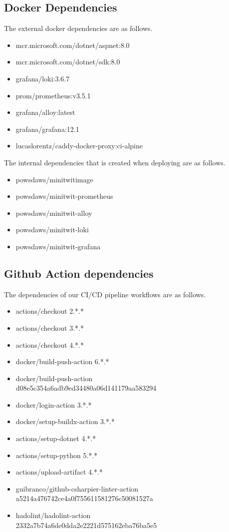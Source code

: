 \subsection*{Docker Dependencies}
The external docker dependencies are as follows.
\begin{itemize}
    \item mcr.microsoft.com/dotnet/aspnet:8.0
    \item mcr.microsoft.com/dotnet/sdk:8.0
    \item grafana/loki:3.6.7
    \item prom/prometheus:v3.5.1
    \item grafana/alloy:latest 
    \item grafana/grafana:12.1
    \item lucaslorentz/caddy-docker-proxy:ci-alpine
\end{itemize}
The internal dependencies that is created when deploying are as follows.
\begin{itemize}
    \item powsdaws/minitwitimage
    \item powsdaws/minitwit-prometheus
    \item powsdaws/minitwit-alloy
    \item powsdaws/minitwit-loki
    \item powsdaws/minitwit-grafana
\end{itemize}

\subsection*{Github Action dependencies}
The dependencies of our CI/CD pipeline workflows are as follows.
\begin{itemize}
    \item actions/checkout 2.*.*
    \item actions/checkout 3.*.*
    \item actions/checkout 4.*.*
    \item docker/build-push-action 6.*.*
    \item docker/build-push-action \\d08e5c354a6adb9ed34480a06d141179aa583294
    \item docker/login-action 3.*.*
    \item docker/setup-buildx-action 3.*.*
    \item actions/setup-dotnet 4.*.*
    \item actions/setup-python 5.*.*
    \item actions/upload-artifact 4.*.*
    \item guibranco/github-csharpier-linter-action\\ a5214a476742ce4a0f755611581276c50081527a
    \item hadolint/hadolint-action \\2332a7b74a6de0dda2e2221d575162eba76ba5e5
\end{itemize}

